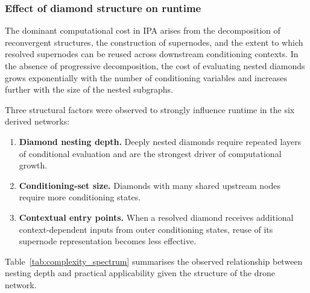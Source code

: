 \documentclass[preprint,12pt]{elsarticle}
\begin{document}
\subsubsection{Effect of diamond structure on runtime}

The dominant computational cost in IPA arises from the decomposition of reconvergent structures, the construction of supernodes, and the extent to which resolved supernodes can be reused across downstream conditioning contexts. In the absence of progressive decomposition, the cost of evaluating nested diamonds grows exponentially with the number of conditioning variables and increases further with the size of the nested subgraphs.

Three structural factors were observed to strongly influence runtime in the six derived networks:
\begin{enumerate}
    \item \textbf{Diamond nesting depth.} Deeply nested diamonds require repeated layers of conditional evaluation and are the strongest driver of computational growth.
    \item \textbf{Conditioning-set size.} Diamonds with many shared upstream nodes require more conditioning states.
    \item \textbf{Contextual entry points.} When a resolved diamond receives additional context-dependent inputs from outer conditioning states, reuse of its supernode representation becomes less effective.
\end{enumerate}


Table~\ref{tab:complexity_spectrum} summarises the observed relationship between nesting depth and practical applicability given the structure of the drone network.

\begin{table}[ht]
\caption{Empirical tractability spectrum for exact reliability analysis with IPA on the derived drone network DAGs.}
\label{tab:complexity_spectrum}
\centering
{}
\end{table}
\end{document}
